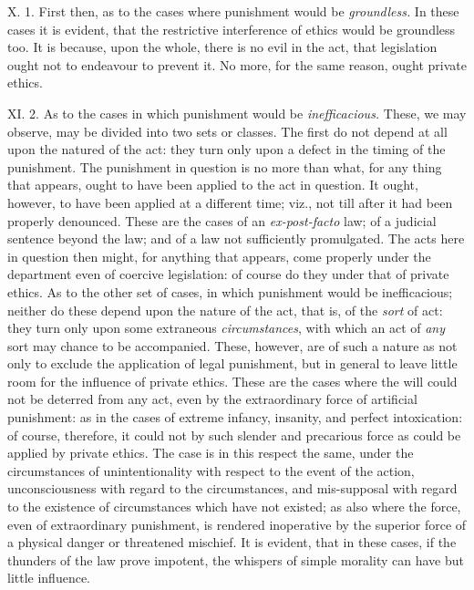 \documentclass[12pt]{report}
\begin{document}
X. 1. First then, as to the cases where punishment would be
\emph{groundless.} In these cases it is evident, that the restrictive
interference of ethics would be groundless too. It is because, upon the
whole, there is no evil in the act, that legislation ought not to
endeavour to prevent it. No more, for the same reason, ought private
ethics.

XI. 2. As to the cases in which punishment would be
\emph{inefficacious.} These, we may observe, may be divided into two
sets or classes. The first do not depend at all upon the natured of the
act: they turn only upon a defect in the timing of the punishment. The
punishment in question is no more than what, for any thing that appears,
ought to have been applied to the act in question. It ought, however, to
have been applied at a different time; viz., not till after it had been
properly denounced. These are the cases of an \emph{ex-post-facto} law;
of a judicial sentence beyond the law; and of a law not sufficiently
promulgated. The acts here in question then might, for anything that
appears, come properly under the department even of coercive
legislation: of course do they under that of private ethics. As to the
other set of cases, in which punishment would be inefficacious; neither
do these depend upon the nature of the act, that is, of the \emph{sort}
of act: they turn only upon some extraneous \emph{circumstances}, with
which an act of \emph{any} sort may chance to be accompanied. These,
however, are of such a nature as not only to exclude the application of
legal punishment, but in general to leave little room for the influence
of private ethics. These are the cases where the will could not be
deterred from any act, even by the extraordinary force of artificial
punishment: as in the cases of extreme infancy, insanity, and perfect
intoxication: of course, therefore, it could not by such slender and
precarious force as could be applied by private ethics. The case is in
this respect the same, under the circumstances of unintentionality with
respect to the event of the action, unconsciousness with regard to the
circumstances, and mis-supposal with regard to the existence of
circumstances which have not existed; as also where the force, even of
extraordinary punishment, is rendered inoperative by the superior force
of a physical danger or threatened mischief. It is evident, that in
these cases, if the thunders of the law prove impotent, the whispers of
simple morality can have but little influence.
\end{document}
